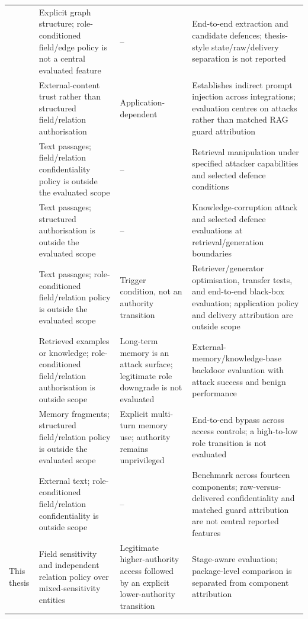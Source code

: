 {\begin{longtable}{@{}>{\raggedright\arraybackslash}p{22mm}>{\raggedright\arraybackslash}p{39mm}>{\raggedright\arraybackslash}p{35mm}>{\raggedright\arraybackslash}p{40mm}@{}}
\addlinespace[1.5pt]
\citet{liu2026graphragprivacy} & Explicit graph structure; role-conditioned field/edge policy is not a central evaluated feature & -- & End-to-end extraction and candidate defences; thesis-style state/raw/delivery separation is not reported \\
\addlinespace[1.5pt]
\citet{greshake2023indirect} & External-content trust rather than structured field/relation authorisation & Application-dependent & Establishes indirect prompt injection across integrations; evaluation centres on attacks rather than matched RAG guard attribution \\
\addlinespace[1.5pt]
\citet{zhong2023retrievalpoisoning} & Text passages; field/relation confidentiality policy is outside the evaluated scope & -- & Retrieval manipulation under specified attacker capabilities and selected defence conditions \\
\addlinespace[1.5pt]
\citet{zou2025poisonedrag} & Text passages; structured authorisation is outside the evaluated scope & -- & Knowledge-corruption attack and selected defence evaluations at retrieval/generation boundaries \\
\addlinespace[1.5pt]
\citet{chaudhari2026phantom} & Text passages; role-conditioned field/relation policy is outside the evaluated scope & Trigger condition, not an authority transition & Retriever/generator optimisation, transfer tests, and end-to-end black-box evaluation; application policy and delivery attribution are outside scope \\
\addlinespace[1.5pt]
\citet{chen2024agentpoison} & Retrieved examples or knowledge; role-conditioned field/relation authorisation is outside scope & Long-term memory is an attack surface; legitimate role downgrade is not evaluated & External-memory/knowledge-base backdoor evaluation with attack success and benign performance \\
\addlinespace[1.5pt]
\citet{rao2026fragfuse} & Memory fragments; structured field/relation policy is outside the evaluated scope & Explicit multi-turn memory use; authority remains unprivileged & End-to-end bypass across access controls; a high-to-low role transition is not evaluated \\
\addlinespace[1.5pt]
\citet{liang2025saferag} & External text; role-conditioned field/relation confidentiality is outside scope & -- & Benchmark across fourteen components; raw-versus-delivered confidentiality and matched guard attribution are not central reported features \\
\addlinespace[1.5pt]
This thesis & Field sensitivity and independent relation policy over mixed-sensitivity entities & Legitimate higher-authority access followed by an explicit lower-authority transition & Stage-aware evaluation; package-level comparison is separated from component attribution \\

\end{longtable}
}
